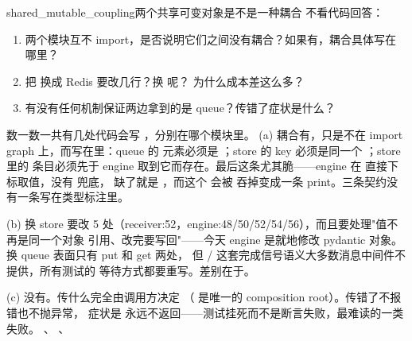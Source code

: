 \begin{checkpoint}{shared_mutable_coupling}{两个共享可变对象是不是一种耦合}
不看代码回答：
\begin{enumerate}[label=(\alph*)]
  \item 两个模块互不 import，是否说明它们之间没有耦合？如果有，耦合具体写在哪里？
  \item 把  换成 Redis 要改几行？换  呢？
        为什么成本差这么多？
  \item 有没有任何机制保证两边拿到的是 queue？传错了症状是什么？
\end{enumerate}
\hint 数一数一共有几处代码会写 ，分别在哪个模块里。
\ifshowanswers
\tcblower
\answer (a) 耦合有，只是不在 import graph 上，而写在里：queue 的
元素必须是 ；store 的 key 必须是同一个 ；store 里的
条目必须先于 engine 取到它而存在。最后这条尤其脆——engine 在
 直接下标取值，没有  兜底，
缺了就是 ，而这个  会被  吞掉变成一条
print。三条契约没有一条写在类型标注里。

(b) 换 store 要改 5 处（receiver:52，engine:48/50/52/54/56），而且要处理"值不再是同一个对象
引用、改完要写回"——今天 engine 是就地修改 pydantic 对象。换 queue 表面只有 put 和 get 两处，
但  /  这套完成信号语义大多数消息中间件不提供，所有测试的
等待方式都要重写。差别在于。

(c) 没有。传什么完全由调用方决定
（ 是唯一的 composition root）。传错了不报错也不抛异常，
症状是  永远不返回——测试挂死而不是断言失败，最难读的一类失败。
\whereincode {}、
、
\fi
\end{checkpoint}

